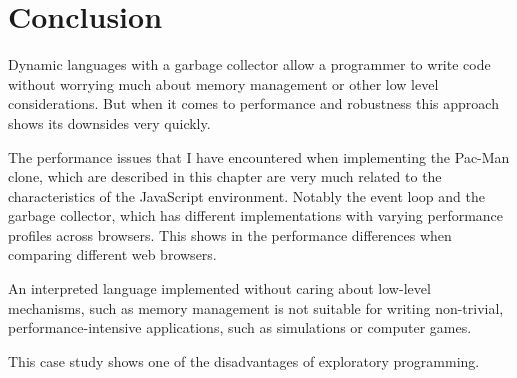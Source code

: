 \section{Conclusion}
Dynamic languages with a garbage collector allow a programmer to write code without worrying much about memory management or other low level considerations. But when it comes to performance and robustness this approach shows its downsides very quickly. 

The performance issues that I have encountered when implementing the Pac-Man clone, which are described in this chapter are very much related to the characteristics of the JavaScript environment. Notably the event loop and the garbage collector, which has different implementations with varying performance profiles across browsers. This shows in the performance differences when comparing different web browsers.

An interpreted language implemented without caring about low-level mechanisms, such as memory management is not suitable for writing non-trivial, performance-intensive applications, such as simulations or computer games.

This case study shows one of the disadvantages of exploratory programming.
